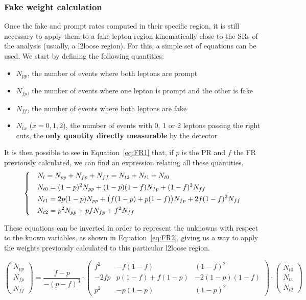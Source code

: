 \documentclass[a4paper, 10pt, openright]{report}
\begin{document}
\subsubsection*{Fake weight calculation}

Once the fake and prompt rates computed in their specific region, it is still necessary to apply them to a fake-lepton region kinematically close to the \acp{SR} of the analysis (usually, a l2loose region). For this, a simple set of equations can be used. We start by defining the following quantities:

\begin{itemize}
\item $N_{pp}$, the number of events where both leptons are prompt
\item $N_{fp}$, the number of events where one lepton is prompt and the other is fake
\item $N_{ff}$, the number of events where both leptons are fake
\item $N_{tx}$ ($x = 0,1,2$), the number of events with 0, 1 or 2 leptons passing the right cuts, the \textbf{only quantity directly measurable} by the detector
\end{itemize}

It is then possible to see in Equation~\ref{eq:FR1} that, if $p$ is the \ac{PR} and $f$ the \ac{FR} previously calculated, we can find an expression relating all these quantities.
\begin{equation}
\label{eq:FR1}
\begin{dcases}
&N_l = N_{pp} + N_{fp} + N_{ff} = N_{t2} + N_{t1} + N_{t0} \\
& N_{t0} = (1-p)^2N_{pp} + (1-p)(1-f)N_{fp}+(1-f)^2N_{ff} \\
& N_{t1} = 2p(1-p)N_{pp} + \big(f(1-p)+p(1-f)\big)N_{fp}+2f(1-f)^2N_{ff} \\
& N_{t2} = p^2N_{pp} + pfN_{fp}+f^2N_{ff}
\end{dcases}
\end{equation}

These equations can be inverted in order to represent the unknowns with respect to the known variables, as shown in Equation~\ref{eq:FR2}, giving us a way to apply the weights previously calculated to this particular l2loose region.

\begin{equation}
\label{eq:FR2}
\begin{pmatrix}
N_{pp} \\ N_{fp} \\ N_{ff}
\end{pmatrix} = \frac{f-p}{-(p-f)^3} \cdot 
\begin{pmatrix}
f^2 & -f(1-f) & (1-f)^2 \\ -2fp & p(1-f)+f(1-p) & -2(1-p)(1-f) \\ p^2 & -p(1-p) & (1-p)^2
\end{pmatrix} \cdot 
\begin{pmatrix}
N_{t0} \\ N_{t1} \\ N_{t2}
\end{pmatrix}
\end{equation}
\end{document}
